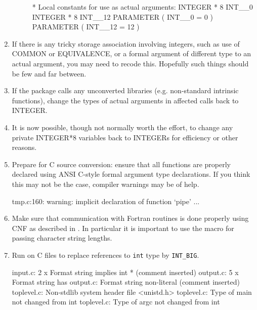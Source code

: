 \documentclass[twoside,11pt,nolof]{starlink}
\providecommand{\xdofilter}[1]{\htmlref{\texttt{do-#1}}{do-xxx}}
\providecommand{\cc}[1]{\texttt{#1}}
\newenvironment{squote}{\begin{small}}{\end{small}}
\begin{document}
\begin{enumerate}
\begin{description}
\begin{squote}
\begin{terminalv}
*  Local constants for use as actual arguments:
      INTEGER * 8 INT__0
      INTEGER * 8 INT__12
      PARAMETER ( INT__0 = 0 )
      PARAMETER ( INT__12 = 12 )
\end{terminalv}
\end{squote}
%
\end{description}
%
\item
If there is any tricky storage association involving integers,
such as use of COMMON or EQUIVALENCE, or a formal argument of
different type to an actual argument, you may need to recode this.
Hopefully such things should be few and far between.
%
\item
If the package calls any unconverted libraries
(e.g. non-standard intrinsic functions), change the types of
actual arguments in affected calls back to INTEGER.
%
\item
It is now possible, though not normally worth the effort,
to change any private INTEGER*8 variables back to INTEGERs
for efficiency or other reasons.
%
\item
Prepare for C source conversion: ensure that all functions are
properly declared using ANSI C-style formal argument type declarations.
If you think this may not be the case, compiler warnings may be of help.
\begin{squote}
\begin{terminalv}
tmp.c:160: warning: implicit declaration of function `pipe'
    ...
\end{terminalv}
\end{squote}
%
\item
Make sure that communication with Fortran routines is done properly
using CNF as described in .
In particular it is important to use the 
macro for passing character string lengths.
%
\item
Run \xdofilter{crepint} on C files to replace references to \cc{int} type
by \cc{INT\_BIG}.
\begin{squote}
\begin{terminalv}
input.c:               2 x Format string implies int * (comment inserted)
output.c:              5 x Format string has %
output.c:                  Format string non-literal (comment inserted)
toplevel.c:                Non-stdlib system header file <unistd.h>
toplevel.c:                Type of main not changed from int
toplevel.c:                Type of argc not changed from int


\end{terminalv}
\end{squote}
\end{enumerate}
\end{document}
